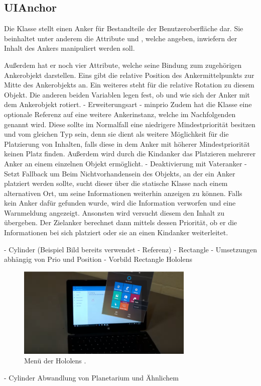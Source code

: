 		\subsection{UIAnchor}
			Die Klasse  stellt einen Anker für Bestandteile der Benutzeroberfläche dar. Sie beinhaltet unter anderem die Attribute  und , welche angeben, inwiefern der Inhalt des Ankers manipuliert werden soll. 
			
			Außerdem hat er noch vier Attribute, welche seine Bindung zum zugehörigen Ankerobjekt darstellen. Eins gibt die relative Position des Ankermittelpunkts zur Mitte des Ankerobjekts an. Ein weiteres steht für die relative Rotation zu diesem Objekt. Die anderen beiden Variablen legen fest, ob und wie sich der Anker mit dem Ankerobjekt rotiert. 
			- Erweiterungsart
			- minprio
			Zudem hat die Klasse eine optionale Referenz auf eine weitere Ankerinstanz, welche im Nachfolgenden  genannt wird. Diese sollte im Normalfall eine niedrigere Mindestpriorität besitzen und vom gleichen Typ sein, denn sie dient als weitere Möglichkeit für die Platzierung von Inhalten, falls diese in dem Anker mit höherer Mindestpriorität keinen Platz finden. Außerdem wird durch die Kindanker das Platzieren mehrerer Anker an einem einzelnen Objekt ermöglicht. - Deaktivierung mit Vateranker
			- Setzt Fallback um
			Beim Nichtvorhandensein des Objekts, an der ein Anker platziert werden sollte, sucht dieser über die statische Klasse  nach einem alternativen Ort, um seine Informationen weiterhin anzeigen zu können.
			Falls kein Anker dafür gefunden wurde, wird die Information verworfen und eine Warnmeldung angezeigt. Ansonsten wird versucht diesem den Inhalt zu übergeben. Der Zielanker berechnet dann mittels dessen Priorität, ob er die Informationen bei sich platziert oder sie an einen Kindanker weiterleitet.
			
			- Cylinder (Beispiel Bild bereits verwendet - Referenz)
			- Rectangle 
			- Umsetzungen abhängig von Prio und Position
			- Vorbild Rectangle Hololens
			\begin{figure}[htbp]
				\centering
				\includegraphics[width=0.75\textwidth]{figures/HololensMain.png}
				\caption{Menü der Hololens .}
				\label{fig:cylinder_mapping}
			\end{figure}
			- Cylinder Abwandlung von Planetarium und Ähnlichem
		

